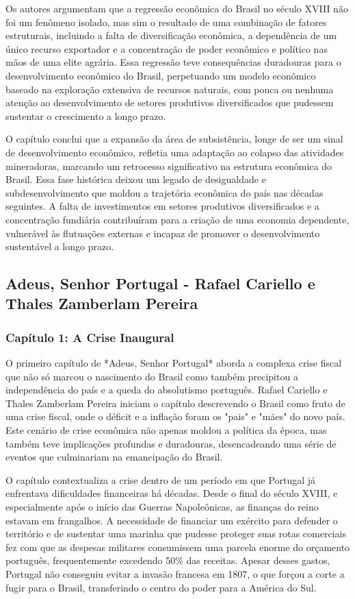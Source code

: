 \documentclass[a4paper,12pt]{article}[abntex2]
\begin{document}
Os autores argumentam que a regressão econômica do Brasil no século XVIII não foi um fenômeno isolado, mas sim o resultado de uma combinação de fatores estruturais, incluindo a falta de diversificação econômica, a dependência de um único recurso exportador e a concentração de poder econômico e político nas mãos de uma elite agrária. Essa regressão teve consequências duradouras para o desenvolvimento econômico do Brasil, perpetuando um modelo econômico baseado na exploração extensiva de recursos naturais, com pouca ou nenhuma atenção ao desenvolvimento de setores produtivos diversificados que pudessem sustentar o crescimento a longo prazo.

O capítulo conclui que a expansão da área de subsistência, longe de ser um sinal de desenvolvimento econômico, refletia uma adaptação ao colapso das atividades mineradoras, marcando um retrocesso significativo na estrutura econômica do Brasil. Essa fase histórica deixou um legado de desigualdade e subdesenvolvimento que moldou a trajetória econômica do país nas décadas seguintes. A falta de investimentos em setores produtivos diversificados e a concentração fundiária contribuíram para a criação de uma economia dependente, vulnerável às flutuações externas e incapaz de promover o desenvolvimento sustentável a longo prazo.

\newpage
\subsection{\textbf{Adeus, Senhor Portugal - Rafael Cariello e Thales Zamberlam Pereira}}

\subsubsection{\textbf{Capítulo 1: A Crise Inaugural}}

O primeiro capítulo de *Adeus, Senhor Portugal* aborda a complexa crise fiscal que não só marcou o nascimento do Brasil como também precipitou a independência do país e a queda do absolutismo português. Rafael Cariello e Thales Zamberlam Pereira iniciam o capítulo descrevendo o Brasil como fruto de uma crise fiscal, onde o déficit e a inflação foram os "pais" e "mães" do novo país. Este cenário de crise econômica não apenas moldou a política da época, mas também teve implicações profundas e duradouras, desencadeando uma série de eventos que culminariam na emancipação do Brasil.

O capítulo contextualiza a crise dentro de um período em que Portugal já enfrentava dificuldades financeiras há décadas. Desde o final do século XVIII, e especialmente após o início das Guerras Napoleônicas, as finanças do reino estavam em frangalhos. A necessidade de financiar um exército para defender o território e de sustentar uma marinha que pudesse proteger suas rotas comerciais fez com que as despesas militares consumissem uma parcela enorme do orçamento português, frequentemente excedendo 50\% das receitas. Apesar desses gastos, Portugal não conseguiu evitar a invasão francesa em 1807, o que forçou a corte a fugir para o Brasil, transferindo o centro do poder para a América do Sul.
\end{document}
